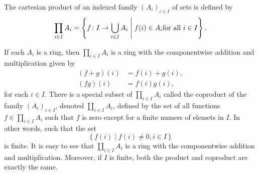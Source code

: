 \documentclass[11pt,a4paper]{article}
\begin{document}
\begin{exa}
The cartesian product of an indexed family $(A_i)_{i\in I}$ of  sets is defined by
\[\prod_{i\in I} A_i=\left\lbrace f\colon I \to \bigcup_{i\in I} A_i \;\Bigg|\;  f(i)\in A_i \text{for all } i\in I \right\rbrace.\]

If each $A_i$ is a ring, then $\prod_{i\in I} A_i$  is a ring with the componentwise addition and multiplication given by 
\begin{align*}
    (f+g)(i)&=f(i)+g(i),\\
    (fg)(i)&=f(i)g(i),
\end{align*}
for each $i\in I$. There is a special subset of $\prod_{i\in I} A_i$ called the coproduct of the family $(A_i)_{i\in I}$, denoted \(\coprod_{i\in I} A_i\), defined by the set of all functions $f\in \prod_{i\in I} A_i$ such that $f$ is zero except for a finite numers of elemets in $I$.
In other words, such that the set 
\[
\left\{ f(i) \mid f(i) \neq 0, i\in I \right\}
\]
is finite.
It is easy to see that \(\coprod_{i\in I} A_i\)  is a ring with the componentwise addition and multiplication.
Moreover, if \(I\) is finite, both the product and coproduct are exactly the same.
\end{exa}


\end{document}
